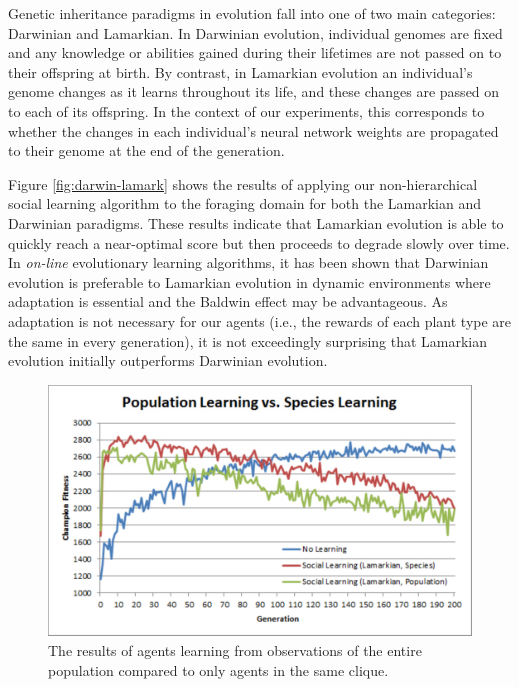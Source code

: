 \documentclass{acm_proc_article-sp}
\begin{document}
Genetic inheritance paradigms in evolution fall into one of two main categories: Darwinian and Lamarkian. In Darwinian evolution, individual genomes are fixed and any knowledge or abilities gained during their lifetimes are not passed on to their offspring at birth. By contrast, in Lamarkian evolution an individual's genome changes as it learns throughout its life, and these changes are passed on to each of its offspring. In the context of our experiments, this corresponds to whether the changes in each individual's neural network weights are propagated to their genome at the end of the generation.

Figure \ref{fig:darwin-lamark} shows the results of applying our non-hierarchical social learning algorithm to the foraging domain for both the Lamarkian and Darwinian paradigms. These results indicate that Lamarkian evolution is able to quickly reach a near-optimal score but then proceeds to degrade slowly over time. In  \textit{on-line} evolutionary learning algorithms, it has been shown \cite{whiteson2006evolutionary} that Darwinian evolution is preferable to Lamarkian evolution in dynamic environments where adaptation is essential and the Baldwin effect \cite{simpson1953baldwin} may be advantageous. As adaptation is not necessary for our agents (i.e., the rewards of each plant type are the same in every generation), it is not exceedingly surprising that Lamarkian evolution initially outperforms Darwinian evolution.



\begin{figure}
  \centering
    \includegraphics[scale=.35]{population_species.pdf}
  \caption{The results of agents learning from observations of the entire population compared to only agents in the same clique.}
  \label{fig:population-species}
\end{figure}
\end{document}
